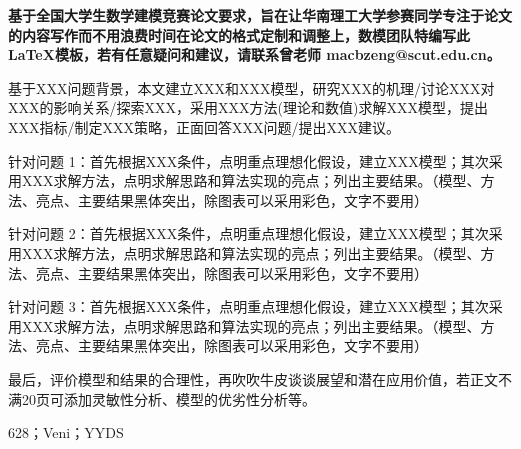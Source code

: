 \documentclass[12pt,utf8]{article}
\begin{document}

\begin{center} 
   \bfseries{}
   \vspace{2ex}
   
   \bfseries{}
\end{center}


\textbf{基于全国大学生数学建模竞赛论文要求，旨在让华南理工大学参赛同学专注于论文的内容写作而不用浪费时间在论文的格式定制和调整上，数模团队特编写此 \LaTeX 模板，若有任意疑问和建议，请联系曾老师 macbzeng@scut.edu.cn。\color{blue}{Veni修改内容：修正原模板中的dkgreen颜色报错；修正原模板中插入代码的时候单行代码过长而无法显示；改变附录代码插入格式，改为lstinputlisting，直接输入文件名，不必再CV；改变文献引用格式，采用gbt7714-2015格式，同时修正了开源模板中的学位论文出现[出版社不详]的问题；修正目录与ref的颜色冲突。应该没有bug了吧。}}

基于XXX问题背景，本文建立XXX和XXX模型，研究XXX的机理/讨论XXX对XXX的影响关系/探索XXX，采用XXX方法(理论和数值)求解XXX模型，提出XXX指标/制定XXX策略，正面回答XXX问题/提出XXX建议。

针对问题 1：首先根据XXX条件，点明重点理想化假设，建立XXX模型；其次采用XXX求解方法，点明求解思路和算法实现的亮点；列出主要结果。（模型、方法、亮点、主要结果黑体突出，除图表可以采用彩色，文字不要用）

针对问题 2：首先根据XXX条件，点明重点理想化假设，建立XXX模型；其次采用XXX求解方法，点明求解思路和算法实现的亮点；列出主要结果。（模型、方法、亮点、主要结果黑体突出，除图表可以采用彩色，文字不要用）

针对问题 3：首先根据XXX条件，点明重点理想化假设，建立XXX模型；其次采用XXX求解方法，点明求解思路和算法实现的亮点；列出主要结果。（模型、方法、亮点、主要结果黑体突出，除图表可以采用彩色，文字不要用）

最后，评价模型和结果的合理性，再吹吹牛皮谈谈展望和潜在应用价值，若正文不满20页可添加灵敏性分析、模型的优劣性分析等。


\vspace{2ex}

 628；Veni；YYDS
\thispagestyle{empty}


\newpage

\begin{center}
	\tableofcontents
\end{center}
\setcounter{page}{0}
\thispagestyle{empty}
\newpage
\end{document}
